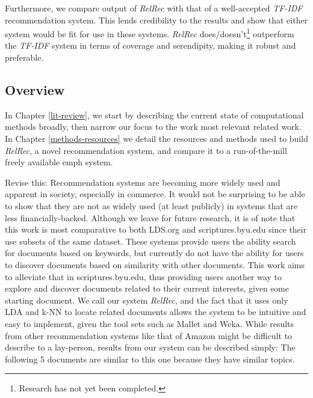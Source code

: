 Furthermore, we compare output of \textit{\emph{RelRec}} with that of a well-accepted \emph{TF-IDF} recommendation system. This lends credibility to the results and show that either system would be fit for use in these systems. \textit{\emph{RelRec}} does/doesn't\footnote{Research has not yet been completed.} outperform the \emph{TF-IDF} system in terms of coverage and serendipity, making it robust and preferable. %



\subsection {Overview}
In Chapter \ref{lit-review}, we start by describing the current state of computational methods broadly, then narrow our focus to the work most relevant related work. In Chapter \ref{methods-resources} we detail the resources and methods used to build \emph{RelRec}, a novel recommendation system, and compare it to a run-of-the-mill freely available emph system.



Revise this:
Recommendation systems are becoming more widely used and apparent in society, especially in commerce. It would not be surprising to be able to show that they are not as widely used (at least publicly) in systems that are less financially-backed. Although we leave for future research, it is of note that this work is most comparative to both LDS.org and scriptures.byu.edu since their use subsets of the same dataset. These systems provide users the ability search for documents based on keywords, but currently do not have the ability for users to discover documents based on similarity with other documents. This work aims to alleviate that in scriptures.byu.edu, thus providing users another way to explore and discover documents related to their current interests, given some starting document. We call our system \emph{RelRec}, and the fact that it uses only LDA and k-NN to locate related documents allows the system to be intuitive and easy to implement, given the tool sets such as Mallet and Weka. While results from other recommendation systems like that of Amazon might be difficult to describe to a lay-person, results from our system can be described simply: The following 5 documents are similar to this one because they have similar topics.





